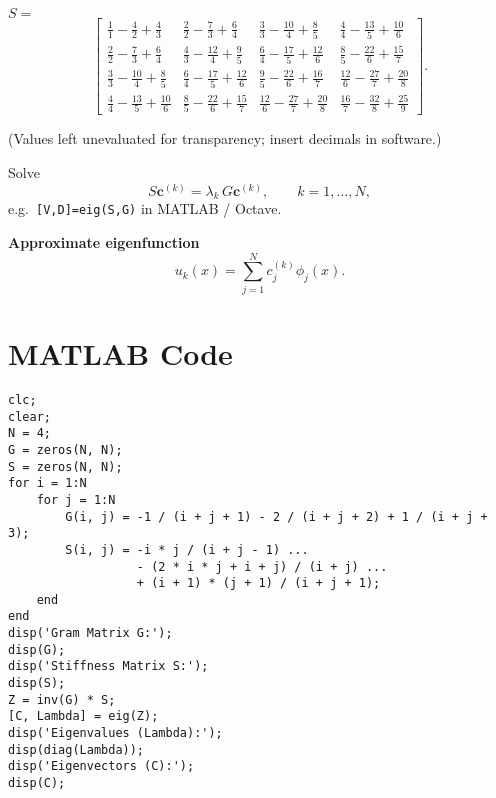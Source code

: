 \documentclass{article}
\begin{document}
$S=$
\[
\begin{bmatrix}
\frac{1}{1}-\frac{4}{2}+\frac{4}{3} & 
\frac{2}{2}-\frac{7}{3}+\frac{6}{4} & 
\frac{3}{3}-\frac{10}{4}+\frac{8}{5} & 
\frac{4}{4}-\frac{13}{5}+\frac{10}{6}\\
\frac{2}{2}-\frac{7}{3}+\frac{6}{4} &
\frac{4}{3}-\frac{12}{4}+\frac{9}{5} &
\frac{6}{4}-\frac{17}{5}+\frac{12}{6}&
\frac{8}{5}-\frac{22}{6}+\frac{15}{7}\\
\frac{3}{3}-\frac{10}{4}+\frac{8}{5}&
\frac{6}{4}-\frac{17}{5}+\frac{12}{6}&
\frac{9}{5}-\frac{22}{6}+\frac{16}{7}&
\frac{12}{6}-\frac{27}{7}+\frac{20}{8}\\
\frac{4}{4}-\frac{13}{5}+\frac{10}{6}&
\frac{8}{5}-\frac{22}{6}+\frac{15}{7}&
\frac{12}{6}-\frac{27}{7}+\frac{20}{8}&
\frac{16}{7}-\frac{32}{8}+\frac{25}{9}
\end{bmatrix}.
\]

(Values left unevaluated for transparency; insert decimals in software.)


Solve 
\[
S\mathbf c^{(k)}=\lambda_k\,G\mathbf c^{(k)},\qquad k=1,\dots ,N,
\]
e.g.\ \verb|[V,D]=eig(S,G)| in MATLAB / Octave.  

\textbf{Approximate eigenfunction}  
\[
u_k(x)=\sum_{j=1}^{N}c^{(k)}_j\phi_j(x).
\]


\section*{MATLAB Code}


\begin{tcolorbox}[title=Galerkin Method MATLAB Code]
\begin{lstlisting}
clc;
clear;
N = 4;
G = zeros(N, N);
S = zeros(N, N);
for i = 1:N
    for j = 1:N
        G(i, j) = -1 / (i + j + 1) - 2 / (i + j + 2) + 1 / (i + j + 3);
        S(i, j) = -i * j / (i + j - 1) ...
                  - (2 * i * j + i + j) / (i + j) ...
                  + (i + 1) * (j + 1) / (i + j + 1);
    end
end
disp('Gram Matrix G:');
disp(G);
disp('Stiffness Matrix S:');
disp(S);
Z = inv(G) * S;
[C, Lambda] = eig(Z);
disp('Eigenvalues (Lambda):');
disp(diag(Lambda));
disp('Eigenvectors (C):');
disp(C);
\end{lstlisting}
\end{tcolorbox}
\end{document}
